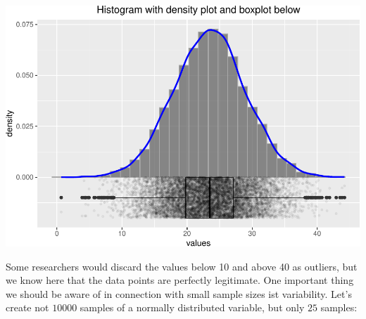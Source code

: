 \documentclass[
]{book}
\newcommand{\pandocbounded}[1]{#1}
\begin{document}
\pandocbounded{\includegraphics[keepaspectratio]{_main_files/figure-latex/unnamed-chunk-17-1.pdf}}

Some researchers would discard the values below 10 and above 40 as outliers, but we know here
that the data points are perfectly legitimate.
One important thing we should be aware of in connection with small sample sizes ist
variability. Let's create not \(10000\) samples of a normally distributed variable, but only \(25\) samples:
\end{document}
